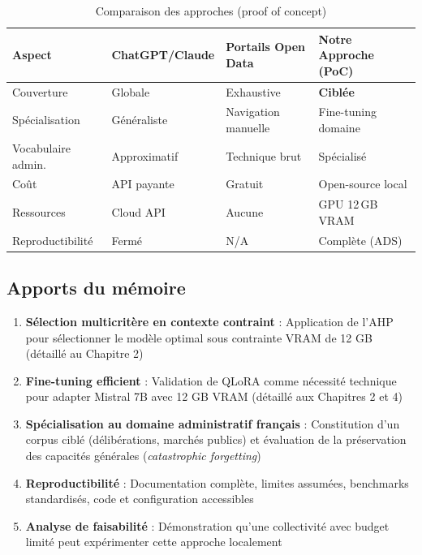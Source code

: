 \begin{table}[htbp]
\centering
\small
\caption{Comparaison des approches (proof of concept)}
\label{tab:comparaison_solutions}
\begin{tabular}{@{}lp{2.5cm}p{2.5cm}p{2.5cm}@{}}
\toprule
\textbf{Aspect} & \textbf{ChatGPT/Claude} & \textbf{Portails Open Data} & \textbf{Notre Approche (PoC)} \\ \midrule
Couverture & Globale & Exhaustive & \textbf{Ciblée} \\
Spécialisation & Généraliste & Navigation manuelle & Fine-tuning domaine \\
Vocabulaire admin. & Approximatif & Technique brut & Spécialisé \\
Coût & API payante & Gratuit & Open-source local \\
Ressources & Cloud API & Aucune & GPU 12\,GB VRAM \\
Reproductibilité & Fermé & N/A & Complète (ADS) \\ \bottomrule
\end{tabular}
\end{table}

\subsection{Apports du mémoire}

\begin{enumerate}
    \item \textbf{Sélection multicritère en contexte contraint} : Application de l'AHP pour sélectionner le modèle optimal sous contrainte VRAM de 12 GB (détaillé au Chapitre 2)
    
    \item \textbf{Fine-tuning efficient} : Validation de QLoRA comme nécessité technique pour adapter Mistral 7B avec 12 GB VRAM (détaillé aux Chapitres 2 et 4)
    
    \item \textbf{Spécialisation au domaine administratif français} : Constitution d'un corpus ciblé (délibérations, marchés publics) et évaluation de la préservation des capacités générales (\textit{catastrophic forgetting})
    
    \item \textbf{Reproductibilité} : Documentation complète, limites assumées, benchmarks standardisés, code et configuration accessibles
    
    \item \textbf{Analyse de faisabilité} : Démonstration qu'une collectivité avec budget limité peut expérimenter cette approche localement
\end{enumerate}


